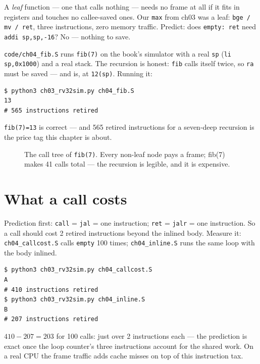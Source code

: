 \begin{checkpoint}\label{cp:leaf04}
A \emph{leaf} function --- one that calls nothing --- needs no frame
at all if it fits in registers and touches no callee-saved ones. Our
\texttt{max} from ch03 was a leaf: \texttt{bge / mv / ret}, three
instructions, zero memory traffic. Predict: does \texttt{empty: ret}
need \texttt{addi sp,sp,-16}? No --- nothing to save.
\end{checkpoint}

\begin{example}\label{ex:fib04}
\texttt{code/ch04\_fib.S} runs \texttt{fib(7)} on the book's
simulator with a real \texttt{sp} (\texttt{li sp,0x1000}) and a real
stack. The recursion is honest: \texttt{fib} calls itself twice, so
\texttt{ra} must be saved --- and is, at \texttt{12(sp)}. Running it:
\begin{lstlisting}
$ python3 ch03_rv32sim.py ch04_fib.S
13
# 565 instructions retired
\end{lstlisting}
\texttt{fib(7)=13} is correct --- and 565 retired instructions for a
seven-deep recursion is the price tag this chapter is about.
\end{example}

\begin{figure}[t]
\centering

\caption[fib(7) call tree]{The call tree of \texttt{fib(7)}. Every
non-leaf node pays a frame; fib(7) makes 41 calls total --- the
recursion is legible, and it is expensive.}
\label{fig:leaftree04}
\end{figure}

\section{What a call costs}
\label{sec:cost04}

\begin{example}\label{ex:cost04}
Prediction first: \texttt{call} = \texttt{jal} = one instruction;
\texttt{ret} = \texttt{jalr} = one instruction. So a call should cost
2 retired instructions beyond the inlined body. Measure it:
\texttt{ch04\_callcost.S} calls \texttt{empty} 100 times;
\texttt{ch04\_inline.S} runs the same loop with the body inlined.
\begin{lstlisting}
$ python3 ch03_rv32sim.py ch04_callcost.S
A
# 410 instructions retired
$ python3 ch03_rv32sim.py ch04_inline.S
B
# 207 instructions retired
\end{lstlisting}
$410-207 = 203$ for 100 calls: just over 2 instructions each ---
the prediction is exact once the loop counter's three instructions
account for the shared work. On a real CPU the frame traffic adds
cache misses on top of this instruction tax.
\end{example}

